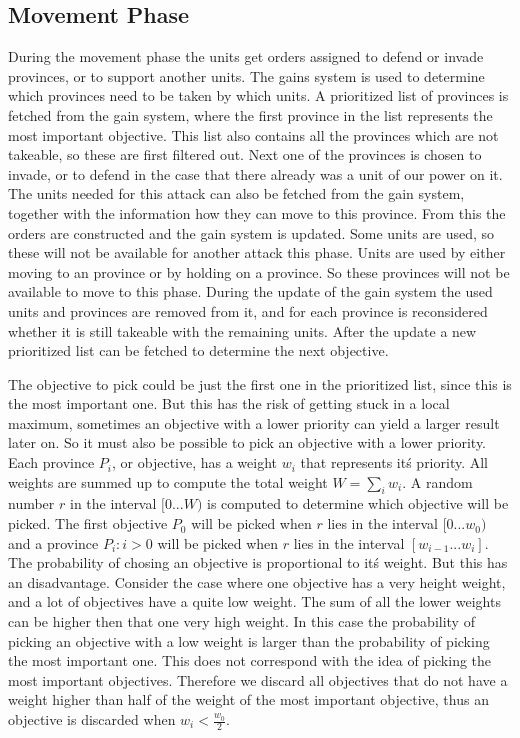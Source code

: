 \documentclass[a4paper]{article} %
\begin{document}
\subsection{Movement Phase} 

During the movement phase the units get orders assigned to defend or invade provinces, or to support another units. The gains system is used to determine which provinces need to be taken by which units. A prioritized list of provinces is fetched from the gain system, where the first province in the list represents the most important objective. This list also contains all the provinces which are not takeable, so these are first filtered out. Next one of the provinces is chosen to invade, or to defend in the case that there already was a unit of our power on it. The units needed for this attack can also be fetched from the gain system, together with the information how they can move to this province. From this the orders are constructed and the gain system is updated. Some units are used, so these will not be available for another attack this phase. Units are used by either moving to an province or by holding on a province. So these provinces will not be available to move to this phase. During the update of the gain system the used units and provinces are removed from it, and for each province is reconsidered whether it is still takeable with the remaining units. After the update a new prioritized list can be fetched to determine the next objective. 

The objective to pick could be just the first one in the prioritized list, since this is the most important one. But this has the risk of getting stuck in a local maximum, sometimes an objective with a lower priority can yield a larger result later on. So it must also be possible to pick an objective with a lower priority. Each province $P_{i}$, or objective, has a weight $w_{i}$ that represents it\'s priority. All weights are summed up to compute the total weight $W=\sum_{i}w_{i}$. A random number $r$ in the interval $[0...W)$ is computed to determine which objective will be picked. The first objective $P_{0}$ will be picked when $r$ lies in the interval $[0...w_{0})$ and a province $P_{i}:i>0$ will be picked when $r$ lies in the interval $[w_{i-1}...w_{i}]$. The probability of chosing an objective is proportional to it\'s weight. But this has an disadvantage. Consider the case where one objective has a very height weight, and a lot of objectives have a quite low weight. The sum of all the lower weights can be higher then that one very high weight. In this case the probability of picking an objective with a low weight is larger than the probability of picking the most important one. This does not correspond with the idea of picking the most important objectives. Therefore we discard all objectives that do not have a weight higher than half of the weight of the most important objective, thus an objective is discarded when $w_{i} < \frac{w_{0}}{2}$.
\end{document}
